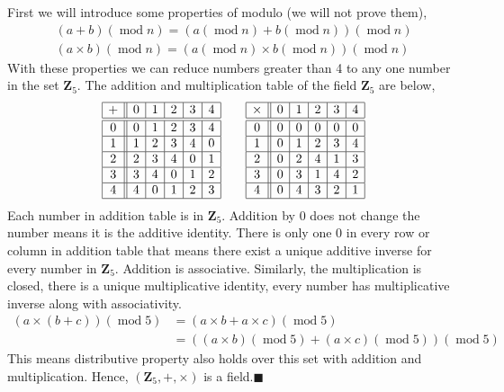 \documentclass[addpoints]{exam}
\theoremstyle{mytheoremstyle}
\theoremstyle{mytheoremstyle}
\theoremstyle{myproblemstyle}
\begin{document}
\begin{questions}
\begin{parts}
		\begin{solution}
			First we will introduce some properties of modulo (we will not prove them),
			\begin{align*}
				(a+b)(\operatorname{mod}{n})=(a(\operatorname{mod}{n})+b(\operatorname{mod}{n}))(\operatorname{mod}{n}) \\
				(a\times b)(\operatorname{mod}{n})=(a(\operatorname{mod}{n})\times b(\operatorname{mod}{n}))(\operatorname{mod}{n})
			\end{align*}
			With these properties we can reduce numbers greater than 4 to any one number in the set \(\mathbf{Z}_{5}\). The addition and multiplication table of the field \(\mathbf{Z}_5\) are below,
			\begin{align*}
				\begin{array}{|c||c|c|c|c|c|}
					\hline
					+ & 0 & 1 & 2 & 3 & 4 \\\hline\hline
					0 & 0 & 1 & 2 & 3 & 4 \\\hline
					1 & 1 & 2 & 3 & 4 & 0 \\\hline
					2 & 2 & 3 & 4 & 0 & 1 \\\hline
					3 & 3 & 4 & 0 & 1 & 2 \\\hline
					4 & 4 & 0 & 1 & 2 & 3 \\\hline
				\end{array} \qquad
				\begin{array}{|c||c|c|c|c|c|}
					\hline
					\times & 0 & 1 & 2 & 3 & 4 \\\hline\hline
					0      & 0 & 0 & 0 & 0 & 0 \\\hline
					1      & 0 & 1 & 2 & 3 & 4 \\\hline
					2      & 0 & 2 & 4 & 1 & 3 \\\hline
					3      & 0 & 3 & 1 & 4 & 2 \\\hline
					4      & 0 & 4 & 3 & 2 & 1 \\\hline
				\end{array}
			\end{align*}
			Each number in addition table is in \(\mathbf{Z}_{5}\). Addition by 0 does not change the number means it is the additive identity. There is only one 0 in every row or column in addition table that means there exist a unique additive inverse for every number in \(\mathbf{Z}_{5}\). Addition is associative. Similarly, the multiplication is closed, there is a unique multiplicative identity, every number has multiplicative inverse along with associativity.
			\begin{align*}
				(a\times(b+c))(\operatorname{mod}{5}) & = (a\times b+a\times c)(\operatorname{mod}{5})                                                   \\
				                                      & = ((a\times b)(\operatorname{mod}{5})+(a\times c)(\operatorname{mod}{5}))(\operatorname{mod}{5})
			\end{align*}
			This means distributive property also holds over this set with addition and multiplication. Hence, \((\mathbf{Z}_{5},+,\times)\) is a field.\hfill\(\blacksquare\)
		\end{solution}


\end{parts}
\end{questions}
\end{document}
